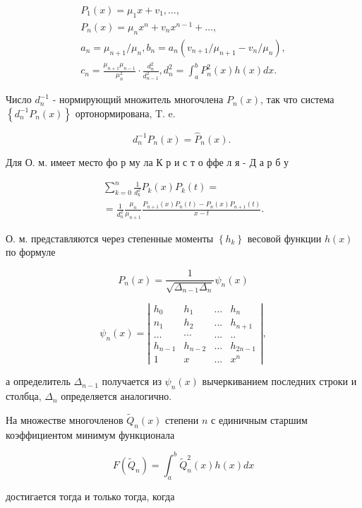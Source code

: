 \documentclass[10pt]{article}
\begin{document}
\[
\begin{gathered}
P_{1}(x)=\mu_{1} x+v_{1}, \ldots, \\
P_{n}(x)=\mu_{n} x^{n}+v_{n} x^{n-1}+\ldots, \\
a_{n}=\mu_{n+1} / \mu_{n}, b_{n}=a_{n}\left(v_{n+1} / \mu_{n+1}-v_{n} / \mu_{n}\right), \\
c_{n}=\frac{\mu_{n+1} \mu_{n-1}}{\mu_{n}^{2}} \cdot \frac{d_{n}^{2}}{d_{n-1}^{2}}, d_{n}^{2}=\int_{a}^{b} P_{n}^{2}(x) h(x) d x .
\end{gathered}
\]

Число $d_{n}^{-1}$ - нормирующий множитель многочлена $P_{n}(x)$, так что система $\left\{d_{n}^{-1} P_{n}(x)\right\}$ ортонормирована, T. e.

\[
d_{n}^{-1} P_{n}(x)=\hat{P}_{n}(x) \text {. }
\]

Для О. м. имеет место фо р му ла К р и с т о ффе л я - Д а р б у

\[
\begin{gathered}
\sum_{k=0}^{n} \frac{1}{d_{k}^{2}} P_{k}(x) P_{k}(t)= \\
=\frac{1}{d_{n}^{2}} \frac{\mu_{n}}{\mu_{n+1}} \frac{P_{n+1}(x) P_{n}(t)-P_{n}(x) P_{n+1}(t)}{x-t} .
\end{gathered}
\]

О. м. представляются через степенные моменты $\left\{h_{k}\right\}$ весовой функции $h(x)$ по формуле

\[
P_{n}(x)=\frac{1}{\sqrt{\Delta_{n-1} \Delta_{n}}} \psi_{n}(x)
\]

\[
\psi_{n}(x)=\left|\begin{array}{llll}
h_{0} & h_{1} & \ldots & h_{n} \\
n_{1} & h_{2} & \ldots & h_{n+1} \\
\ldots & \cdots & \ldots & . . \\
h_{n-1} & h_{n-2} & \ldots & h_{2 n-1} \\
1 & x & \ldots & x^{n}
\end{array}\right|,
\]

а определитель $\Delta_{n-1}$ получается из $\psi_{n}(x)$ вычеркиванием последних строки и столбца, $\Delta_{n}$ определяется аналогично.

На множестве многочленов $\tilde{Q}_{n}(x)$ степени $n$ с единичным старшим коэффициентом минимум функционала

\[
F\left(\tilde{Q}_{n}\right)=\int_{a}^{b} \tilde{Q}_{n}^{2}(x) h(x) d x
\]

достигается тогда и только тогда, когда
\end{document}
